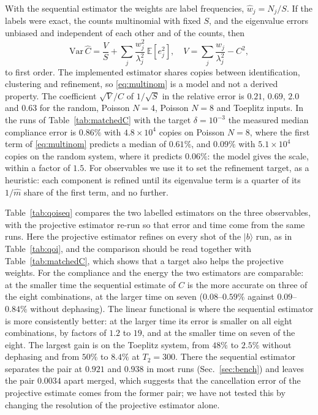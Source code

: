 \documentclass[journal]{IEEEtran}
\begin{document}
With the sequential estimator the weights are label frequencies, $\hat w_j=N_j/S$. If the labels were exact, the counts multinomial with fixed $S$, and the eigenvalue errors unbiased and independent of each other and of the counts, then
\begin{equation}
\mathrm{Var}\,\hat C=\frac VS+\sum_j\frac{w_j^2}{\lambda_j^2}\,\mathbb E[e_j^2],\quad V=\sum_j\frac{w_j}{\lambda_j^2}-C^2,
\label{eq:multinom}
\end{equation}
to first order. The implemented estimator shares copies between identification, clustering and refinement, so \eqref{eq:multinom} is a model and not a derived property. The coefficient $\sqrt V/C$ of $1/\sqrt S$ in the relative error is $0.21$, $0.69$, $2.0$ and $0.63$ for the random, Poisson $N=4$, Poisson $N=8$ and Toeplitz inputs. In the runs of Table~\ref{tab:matchedC} with the target $\delta=10^{-3}$ the measured median compliance error is $0.86\%$ with $4.8\times10^4$ copies on Poisson $N=8$, where the first term of \eqref{eq:multinom} predicts a median of $0.61\%$, and $0.09\%$ with $5.1\times10^4$ copies on the random system, where it predicts $0.06\%$: the model gives the scale, within a factor of $1.5$. For observables we use it to set the refinement target, as a heuristic: each component is refined until its eigenvalue term is a quarter of its $1/\hat m$ share of the first term, and no further.

Table~\ref{tab:qoiseq} compares the two labelled estimators on the three observables, with the projective estimator re-run so that error and time come from the same runs. Here the projective estimator refines on every shot of the $|b\rangle$ run, as in Table~\ref{tab:qoi}, and the comparison should be read together with Table~\ref{tab:matchedC}, which shows that a target also helps the projective weights. For the compliance and the energy the two estimators are comparable: at the smaller time the sequential estimate of $C$ is the more accurate on three of the eight combinations, at the larger time on seven ($0.08$--$0.59\%$ against $0.09$--$0.84\%$ without dephasing). The linear functional is where the sequential estimator is more consistently better: at the larger time its error is smaller on all eight combinations, by factors of $1.2$ to $19$, and at the smaller time on seven of the eight. The largest gain is on the Toeplitz system, from $48\%$ to $2.5\%$ without dephasing and from $50\%$ to $8.4\%$ at $T_2=300$. There the sequential estimator separates the pair at $0.921$ and $0.938$ in most runs (Sec.~\ref{sec:bench}) and leaves the pair $0.0034$ apart merged, which suggests that the cancellation error of the projective estimate comes from the former pair; we have not tested this by changing the resolution of the projective estimator alone.
\end{document}
